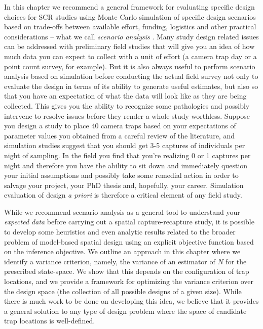 In this chapter we recommend a general framework for evaluating
specific design choices for SCR studies using Monte Carlo simulation
of specific design scenarios 
based on trade-offs between available effort, funding, logistics and
other practical considerations -- what we call {\it scenario analysis}
\citep{sollmann_etal:2012}.  Many study design related issues can be
addressed with preliminary field studies that will give you an idea of
how much data you can expect to collect with a unit of effort (a
camera trap day or a point count survey, for example).  But it is also
always useful to perform scenario analysis based on simulation before
conducting the actual field survey not only to evaluate the design in
terms of its ability to generate useful estimates,
but also so that you have an expectation of what the data will look
like as they are being collected. This gives you the ability to
recognize some pathologies and possibly intervene to resolve issues
before they render a whole study worthless. Suppose you design a study
to place 40 camera traps based on your expectations of parameter
values you obtained from a careful review of the literature, and
simulation studies suggest that you should get 3-5 captures of
individuals per night of sampling. In the field you find that you're
realizing 0 or 1 captures per night and therefore you have the ability
to sit down and immediately question your initial assumptions and
possibly take some remedial action in order to salvage your project,
your PhD thesis and, hopefully, your career. 
Simulation evaluation of design {\it a priori} is therefore a critical
element of any field study.

While we recommend scenario analysis as a general tool to understand
your {\it expected data} before carrying out a spatial
capture-recapture study, it is possible to develop some heuristics and
even analytic results related to the
broader problem of model-based spatial design
\citep{muller:2007} using an explicit objective function based on the
inference objective.  
We outline an approach in this chapter where we identify a variance
criterion, namely, the variance of an estimator of $N$ for the
prescribed state-space. We show that this depends on the configuration
of trap locations, and we provide a framework for optimizing the
variance criterion over the design space (the collection of all
possible designs of a given size). While there is much work to be done
on developing this idea, we believe that it provides a general
solution to any type of design problem where the space of candidate
trap locations is well-defined.



